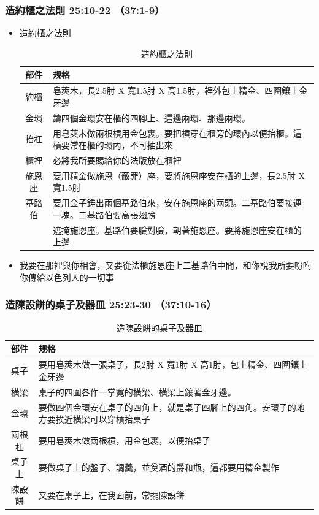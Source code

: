 \subsubsection{造約櫃之法則 25:10-22 （37:1-9）}
\begin{itemize} 
\itemsep-.35em
\item 造約櫃之法則
\begin{table}[H]
\centering
\begin{tabular}{|c|l| }
\hline
\hline
部件 & 规格  \\\hline
約櫃 & 皂莢木，長2.5肘 X 寬1.5肘 X 高1.5肘，裡外包上精金、四圍鑲上金牙邊    \\\hline
金環&鑄四個金環安在櫃的四腳上、這邊兩環、那邊兩環。   \\\hline
抬杠&用皂莢木做兩根槓用金包裹。要把槓穿在櫃旁的環內以便抬櫃。這槓要常在櫃的環內，不可抽出來\\\hline
櫃裡&必將我所要賜給你的法版放在櫃裡　\\\hline
施恩座&要用精金做施恩（蔽罪）座，要將施恩座安在櫃的上邊，長2.5肘 X 寬1.5肘　\\\hline
基路伯&要用金子錘出兩個基路伯來，安在施恩座的兩頭。二基路伯要接連一塊。二基路伯要高張翅膀\\
&遮掩施恩座。基路伯要臉對臉，朝著施恩座。要將施恩座安在櫃的上邊  \\\hline
\end{tabular}
\caption{造約櫃之法則}
\end{table}
\item 我要在那裡與你相會，又要從法櫃施恩座上二基路伯中間，和你說我所要吩咐你傳給以色列人的一切事
\end{itemize}

\subsubsection{造陳設餅的桌子及器皿 25:23-30  （37:10-16）}
\begin{table}[H]
\centering
\begin{tabular}{|c|l| }
\hline
\hline
部件 & 规格   \\\hline
桌子 &要用皂莢木做一張桌子，長2肘 X 寬1肘 X 高1肘，包上精金、四圍鑲上金牙邊    \\\hline
橫梁&桌子的四圍各作一掌寬的橫梁、橫梁上鑲著金牙邊。    \\\hline
金環&要做四個金環安在桌子的四角上，就是桌子四腳上的四角。安環子的地方要挨近橫梁可以穿槓抬桌子\\\hline
兩根杠&要用皂莢木做兩根槓，用金包裹，以便抬桌子\\\hline
桌子上&要做桌子上的盤子、調羹，並奠酒的爵和瓶，這都要用精金製作\\\hline
陳設餅&又要在桌子上，在我面前，常擺陳設餅 \\\hline
\end{tabular}
\caption{造陳設餅的桌子及器皿}
\end{table}

